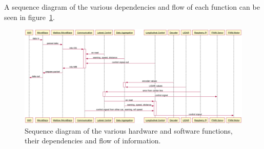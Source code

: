A sequence diagram of the various dependencies and flow of each function can be seen in figure~\ref{fig:sequence}.

\begin{figure}[H]
\centering
\includegraphics[width=\textwidth]{./img/design_sequence3.png}
\caption{Sequence diagram of the various hardware and software functions, their dependencies and flow of information.}\label{fig:sequence}
\end{figure}



